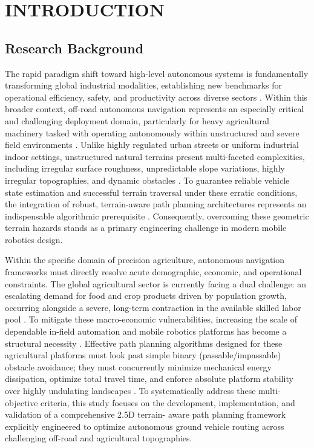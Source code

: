 \chapter{INTRODUCTION}

\section{Research Background}

The rapid paradigm shift toward high-level autonomous systems is fundamentally
transforming global industrial modalities, establishing new benchmarks for
operational efficiency, safety, and productivity across diverse sectors
\citep{Guizzo_2008_threeengineers}. Within this broader context, off-road
autonomous navigation represents an especially critical and challenging
deployment domain, particularly for heavy agricultural machinery tasked with
operating autonomously within unstructured and severe field environments
\citep{Hameed_2021_comprehensivereview}. Unlike highly regulated urban streets
or uniform industrial indoor settings, unstructured natural terrains present
multi-faceted complexities, including irregular surface roughness, unpredictable
slope variations, highly irregular topographies, and dynamic obstacles
\citep{Sofman_2006_improvingrobot}. To guarantee reliable vehicle state
estimation and successful terrain traversal under these erratic conditions, the
integration of robust, terrain-aware path planning architectures represents an
indispensable algorithmic prerequisite \citep{Sedighi_2019_guidedhybrid}.
Consequently, overcoming these geometric terrain hazards stands as a primary
engineering challenge in modern mobile robotics design.

Within the specific domain of precision agriculture, autonomous navigation
frameworks must directly resolve acute demographic, economic, and operational
constraints. The global agricultural sector is currently facing a dual
challenge: an escalating demand for food and crop products driven by population
growth, occurring alongside a severe, long-term contraction in the available
skilled labor pool \citep{Emmi_2014_newtrends}. To mitigate these macro-economic
vulnerabilities, increasing the scale of dependable in-field automation and
mobile robotics platforms has become a structural necessity
\citep{Emmi_2014_newtrends}. Effective path planning algorithms designed for
these agricultural platforms must look past simple binary (passable/impassable)
obstacle avoidance; they must concurrently minimize mechanical energy
dissipation, optimize total travel time, and enforce absolute platform stability
over highly undulating landscapes \citep{Hameed_2021_comprehensivereview}. To
systematically address these multi-objective criteria, this study focuses on the
development, implementation, and validation of a comprehensive 2.5D terrain-
aware path planning framework explicitly engineered to optimize autonomous
ground vehicle routing across challenging off-road and agricultural
topographies.

